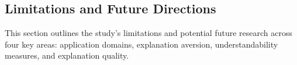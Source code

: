 


\subsection{Limitations and Future Directions}

This section outlines the study's limitations and potential future research across four key areas: application domains, explanation aversion, understandability measures, and explanation quality.

